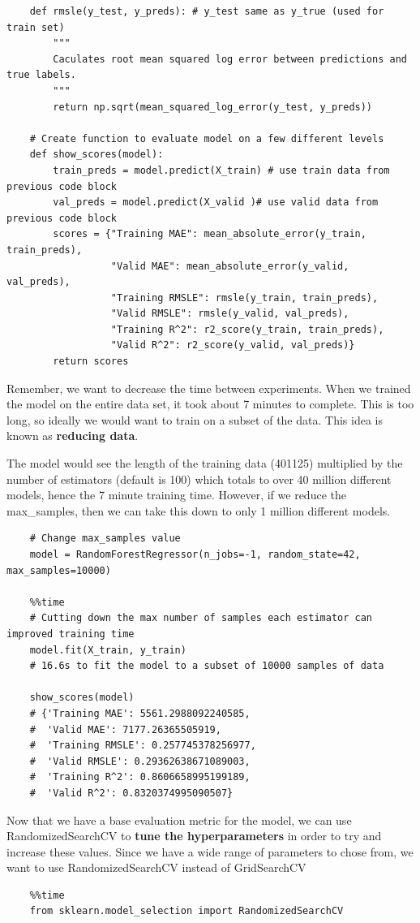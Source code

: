 \documentclass[11pt, a4paper]{article}
\begin{document}
\begin{spacing}{1.1}
\begin{lstlisting}
	def rmsle(y_test, y_preds): # y_test same as y_true (used for train set)
		"""
		Caculates root mean squared log error between predictions and true labels.
		"""
		return np.sqrt(mean_squared_log_error(y_test, y_preds))
	
	# Create function to evaluate model on a few different levels
	def show_scores(model):
		train_preds = model.predict(X_train) # use train data from previous code block
		val_preds = model.predict(X_valid )# use valid data from previous code block
		scores = {"Training MAE": mean_absolute_error(y_train, train_preds),
		          "Valid MAE": mean_absolute_error(y_valid, val_preds),
		          "Training RMSLE": rmsle(y_train, train_preds),
		          "Valid RMSLE": rmsle(y_valid, val_preds),
		          "Training R^2": r2_score(y_train, train_preds),
		          "Valid R^2": r2_score(y_valid, val_preds)}
		return scores \end{lstlisting} \vspace*{1mm}
	Remember, we want to decrease the time between experiments. When we trained the model on the entire data set, it took about 7 minutes to complete. This is too long, so ideally we would want to train on a subset of the data. This idea is known as \textbf{reducing data}. \newpage

	\noindent The model would see the length of the training data (401125) multiplied by the number of estimators (default is 100) which totals to over 40 million different models, hence the 7 minute training time. However, if we reduce the max\_samples, then we can take this down to only 1 million different models. 
	\begin{lstlisting}
	# Change max_samples value
	model = RandomForestRegressor(n_jobs=-1, random_state=42, max_samples=10000)
	
	%%time
	# Cutting down the max number of samples each estimator can improved training time
	model.fit(X_train, y_train)
	# 16.6s to fit the model to a subset of 10000 samples of data
	
	show_scores(model)
	# {'Training MAE': 5561.2988092240585,
	#  'Valid MAE': 7177.26365505919,
	#  'Training RMSLE': 0.257745378256977,
	#  'Valid RMSLE': 0.29362638671089003,
	#  'Training R^2': 0.8606658995199189,
	#  'Valid R^2': 0.8320374995090507} \end{lstlisting} \vspace*{1mm}
	Now that we have a base evaluation metric for the model, we can use RandomizedSearchCV to \textbf{tune the hyperparameters} in order to try and increase these values. Since we have a wide range of parameters to chose from, we want to use RandomizedSearchCV instead of GridSearchCV
	\begin{lstlisting}
	%%time
	from sklearn.model_selection import RandomizedSearchCV
	

\end{lstlisting}
\end{spacing}
\end{document}
